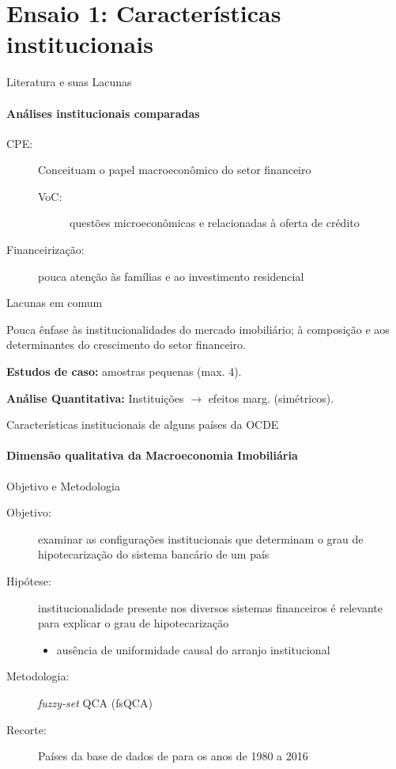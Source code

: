 \section[QCA]{\textbf{Ensaio 1:} Características institucionais}

\begin{frame}{Literatura e suas Lacunas}
\framesubtitle{Análises institucionais comparadas}

\begin{description}
    \item[CPE:] Conceituam o papel macroeconômico do setor financeiro
        \begin{description}
            \item[VoC:] questões microeconômicas e relacionadas à oferta de crédito
        \end{description}
    \item[Financeirização:] pouca atenção às famílias e ao investimento residencial
\end{description}

\begin{alert}{Lacunas em comum}

Pouca ênfase às institucionalidades do mercado imobiliário; à composição e aos determinantes
do crescimento do setor financeiro. 

\textbf{Estudos de caso:} amostras pequenas (max. 4). 

\textbf{Análise Quantitativa:} Instituições $\to$ efeitos marg. (simétricos).
    
\end{alert}
    
\end{frame}

\begin{frame}{Características institucionais de alguns países da OCDE}
\framesubtitle{Dimensão qualitativa da Macroeconomia Imobiliária}
    
\end{frame}

\begin{frame}{Objetivo e Metodologia}
    
\begin{description}
    \item[Objetivo:]  examinar as configurações institucionais que determinam o grau de hipotecarização do sistema bancário de um país
    \item[Hipótese:] institucionalidade presente nos diversos sistemas financeiros é relevante para explicar o grau de hipotecarização
        \begin{itemize}
            \item ausência de uniformidade causal do arranjo institucional \cite{chang_institutions_2011}
        \end{itemize}
    \item[Metodologia:] \textit{fuzzy-set} QCA (fsQCA)
    \item[Recorte:] Países da base de dados de \textcite{jorda_rate_2019} para os anos de 1980 a 2016
\end{description}
\end{frame}

